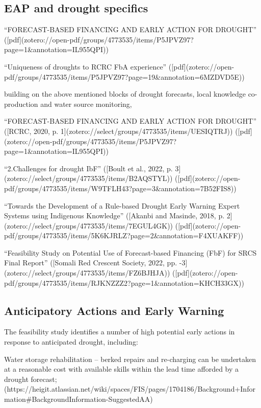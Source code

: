 {\subsection{EAP and drought specifics}
“FORECAST-BASED FINANCING AND EARLY ACTION FOR DROUGHT” ([pdf](zotero://open-pdf/groups/4773535/items/P5JPVZ97?page=1&annotation=IL955QPI))

“Uniqueness of droughts to RCRC FbA experience” ([pdf](zotero://open-pdf/groups/4773535/items/P5JPVZ97?page=19&annotation=6MZDVD5E))

building on the above mentioned blocks of drought forecasts, local knowledge co-production and water source monitoring, 

“FORECAST-BASED FINANCING AND EARLY ACTION FOR DROUGHT” ([RCRC, 2020, p. 1](zotero://select/groups/4773535/items/UESIQTRJ)) ([pdf](zotero://open-pdf/groups/4773535/items/P5JPVZ97?page=1&annotation=IL955QPI))

“2.Challenges for drought IbF” ([Boult et al., 2022, p. 3](zotero://select/groups/4773535/items/B2AQSTYL)) ([pdf](zotero://open-pdf/groups/4773535/items/W9TFLH43?page=3&annotation=7B52FIS8))

“Towards the Development of a Rule-based Drought Early Warning Expert Systems using Indigenous Knowledge” ([Akanbi and Masinde, 2018, p. 2](zotero://select/groups/4773535/items/7EGUL4GK)) ([pdf](zotero://open-pdf/groups/4773535/items/5K6KJRLZ?page=2&annotation=F4XUAKFF))

“Feasibility Study on Potential Use of Forecast-based Financing (FbF) for SRCS Final Report” ([Somali Red Crescent Society, 2022, pp. -3](zotero://select/groups/4773535/items/FZ6BJHJA)) ([pdf](zotero://open-pdf/groups/4773535/items/RJKNZZZ2?page=1&annotation=KHCH33GX))

\subsection{Anticipatory Actions and Early Warning}
The feasibility study identifies a number of high potential early actions in response to anticipated drought, including:

Water storage rehabilitation – berked repairs and re-charging can be undertaken at a reasonable cost with available skills within the lead time afforded by a drought forecast; (https://heigit.atlassian.net/wiki/spaces/FIS/pages/1704186/Background+Information#BackgroundInformation-SuggestedAA)

}
